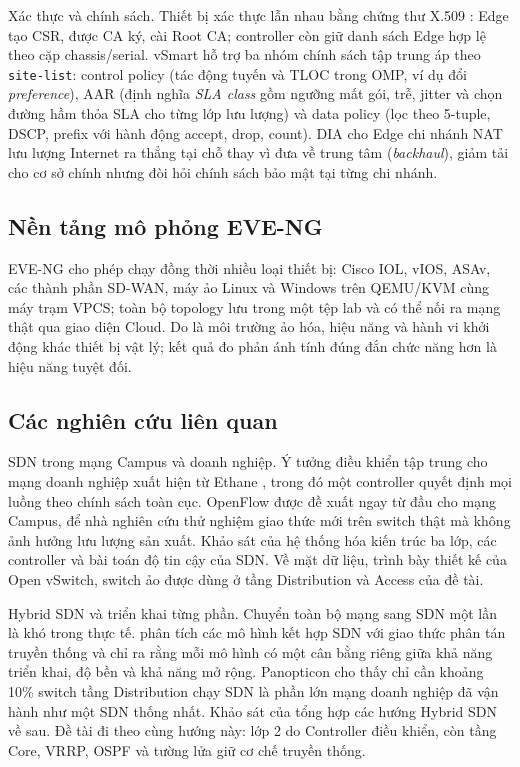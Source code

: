 Xác thực và chính sách. Thiết bị xác thực lẫn nhau bằng chứng thư X.509 \citep{rfc5280_x509}: Edge tạo CSR, được CA ký, cài Root CA; controller còn giữ danh sách Edge hợp lệ theo cặp chassis/serial. vSmart hỗ trợ ba nhóm chính sách tập trung áp theo \texttt{site-list}: control policy (tác động tuyến và TLOC trong OMP, ví dụ đổi \textit{preference}), AAR (định nghĩa \textit{SLA class} gồm ngưỡng mất gói, trễ, jitter và chọn đường hầm thỏa SLA cho từng lớp lưu lượng) và data policy (lọc theo 5-tuple, DSCP, prefix với hành động accept, drop, count). DIA cho Edge chi nhánh NAT lưu lượng Internet ra thẳng tại chỗ thay vì đưa về trung tâm (\textit{backhaul}), giảm tải cho cơ sở chính nhưng đòi hỏi chính sách bảo mật tại từng chi nhánh.

\subsection{Nền tảng mô phỏng EVE-NG}

EVE-NG \citep{eveng_docs} cho phép chạy đồng thời nhiều loại thiết bị: Cisco IOL, vIOS, ASAv, các thành phần SD-WAN, máy ảo Linux và Windows trên QEMU/KVM cùng máy trạm VPCS; toàn bộ topology lưu trong một tệp lab và có thể nối ra mạng thật qua giao diện Cloud. Do là môi trường ảo hóa, hiệu năng và hành vi khởi động khác thiết bị vật lý; kết quả đo phản ánh tính đúng đắn chức năng hơn là hiệu năng tuyệt đối.

\subsection{Các nghiên cứu liên quan}\label{sec:nghien_cuu_lien_quan}

SDN trong mạng Campus và doanh nghiệp. Ý tưởng điều khiển tập trung cho mạng doanh nghiệp xuất hiện từ Ethane \citep{casado2007ethane}, trong đó một controller quyết định mọi luồng theo chính sách toàn cục. OpenFlow \citep{mckeown2008openflow} được đề xuất ngay từ đầu cho mạng Campus, để nhà nghiên cứu thử nghiệm giao thức mới trên switch thật mà không ảnh hưởng lưu lượng sản xuất. Khảo sát của \citet{kreutz2015sdn} hệ thống hóa kiến trúc ba lớp, các controller và bài toán độ tin cậy của SDN. Về mặt dữ liệu, \citet{pfaff2015ovs} trình bày thiết kế của Open vSwitch, switch ảo được dùng ở tầng Distribution và Access của đề tài.

Hybrid SDN và triển khai từng phần. Chuyển toàn bộ mạng sang SDN một lần là khó trong thực tế. \citet{vissicchio2014hybrid} phân tích các mô hình kết hợp SDN với giao thức phân tán truyền thống và chỉ ra rằng mỗi mô hình có một cân bằng riêng giữa khả năng triển khai, độ bền và khả năng mở rộng. Panopticon \citep{levin2014panopticon} cho thấy chỉ cần khoảng 10\% switch tầng Distribution chạy SDN là phần lớn mạng doanh nghiệp đã vận hành như một SDN thống nhất. Khảo sát của \citet{khorsandroo2021hybrid} tổng hợp các hướng Hybrid SDN về sau. Đề tài đi theo cùng hướng này: lớp 2 do Controller điều khiển, còn tầng Core, VRRP, OSPF và tường lửa giữ cơ chế truyền thống.

